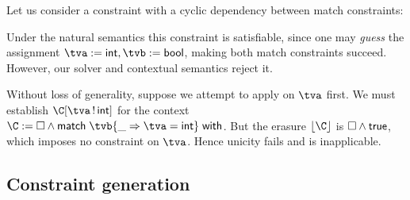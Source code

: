 \documentclass[acmsmall,screen,nonacm%
\Anonymous{,anonymous}{}%
\Final{}{,review}%
]{acmart}
\begin{document}
\begin{example}
  Let us consider a constraint with a cyclic dependency between match
  constraints:
  Under the natural semantics this constraint is satisfiable, since one may
  \emph{guess} the assignment $\tva \is \tint, \tvb \is \tbool$,
  making both match constraints succeed. However, our solver and contextual semantics
  reject it.


  Without loss of generality, suppose we attempt to apply  on
  $\tva$ first. We must establish $\Cshape \C \tva \tint$ for the context $\C
  \is \hole \cand \cmatch \tvb {\cbranch \cpatwild {\cunif \tva \tint}}$. But
  the erasure $\cerase \C$ is $\square \wedge \mathsf{true}$, which imposes no constraint on
  $\tva$. Hence unicity fails and  is inapplicable.

\end{example}
\subsection{Constraint generation}
\label{sec/oml/constraints}
\end{document}

